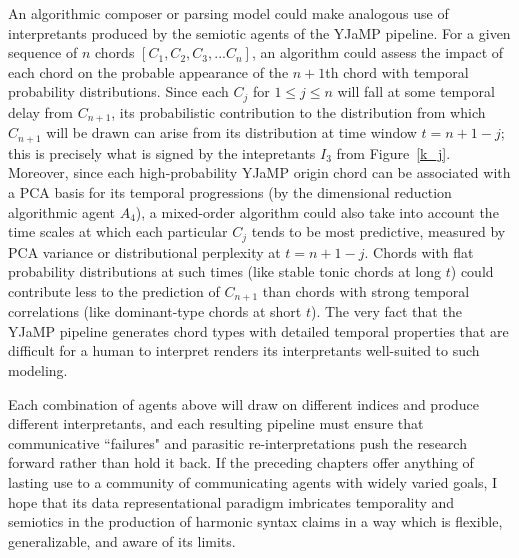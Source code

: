 \begin{enumerate}
An algorithmic composer or parsing model could make analogous use of interpretants produced by the semiotic agents of the YJaMP pipeline.  For a given sequence of $n$ chords $[C_1,C_2,C_3,...C_n]$, an algorithm could assess the impact of each chord on the probable appearance of the $n+1$th chord with temporal probability distributions.  Since each $C_j$ for $1\leq j \leq n$ will fall at some temporal delay from $C_{n+1}$, its probabilistic contribution to the distribution from which $C_{n+1}$ will be drawn can arise from its distribution at time window $t= n+1-j$; this is precisely what is signed by the intepretants $I_3$ from Figure~\ref{k_j}.  Moreover, since each high-probability YJaMP origin chord can be associated with a PCA basis for its temporal progressions (by the dimensional reduction algorithmic agent $A_4$), a mixed-order algorithm could also take into account the time scales at which each particular $C_j$ tends to be most predictive, measured by PCA variance or distributional perplexity at $t=n+1-j$.  Chords with flat probability distributions at such times (like stable tonic chords at long $t$) could contribute less to the prediction of $C_{n+1}$ than chords with strong temporal correlations (like dominant-type chords at short $t$).  The very fact that the YJaMP pipeline generates chord types with detailed temporal properties that are difficult for a human to interpret renders its interpretants well-suited to such modeling.
\end{enumerate}

Each combination of agents above will draw on different indices and produce different interpretants, and each resulting pipeline must ensure that communicative ``failures" and parasitic re-interpretations push the research forward rather than hold it back.  If the preceding chapters offer anything of lasting use to a community of communicating agents with widely varied goals, I hope that its data representational paradigm imbricates temporality and semiotics in the production of harmonic syntax claims in a way which is flexible, generalizable, and aware of its limits.